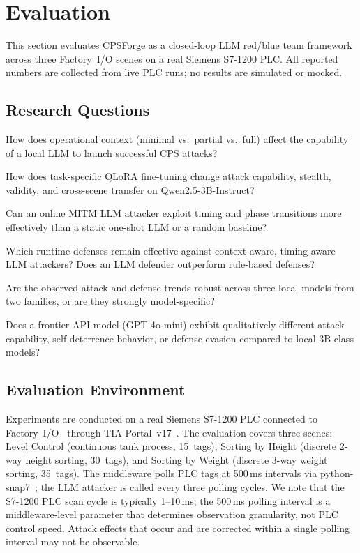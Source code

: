 \section{Evaluation}
\label{sec:evaluation}

This section evaluates CPSForge as a closed-loop LLM red/blue team framework across three Factory~I/O scenes on a real Siemens S7-1200 PLC. All reported numbers are collected from live PLC runs; no results are simulated or mocked.

\subsection{Research Questions}

\begin{description}[leftmargin=1.5em, style=nextline]
    \item[RQ1 (Context Ablation):] How does operational context (minimal vs.\ partial vs.\ full) affect the capability of a local LLM to launch successful CPS attacks?
    \item[RQ2 (Fine-Tuning):] How does task-specific QLoRA fine-tuning change attack capability, stealth, validity, and cross-scene transfer on Qwen2.5-3B-Instruct?
    \item[RQ3 (Attack Mode):] Can an online MITM LLM attacker exploit timing and phase transitions more effectively than a static one-shot LLM or a random baseline?
    \item[RQ4 (Defenses):] Which runtime defenses remain effective against context-aware, timing-aware LLM attackers? Does an LLM defender outperform rule-based defenses?
    \item[RQ5 (Cross-Model Robustness):] Are the observed attack and defense trends robust across three local models from two families, or are they strongly model-specific?
    \item[RQ6 (Frontier Model):] Does a frontier API model (GPT-4o-mini) exhibit qualitatively different attack capability, self-deterrence behavior, or defense evasion compared to local 3B-class models?
\end{description}

\subsection{Evaluation Environment}

Experiments are conducted on a real Siemens S7-1200 PLC connected to Factory~I/O~\cite{factoryio} through TIA Portal~v17~\cite{tiaportal}. The evaluation covers three scenes: Level Control (continuous tank process, 15~tags), Sorting by Height (discrete 2-way height sorting, 30~tags), and Sorting by Weight (discrete 3-way weight sorting, 35~tags). The middleware polls PLC tags at 500\,ms intervals via python-snap7~\cite{snap7}; the LLM attacker is called every three polling cycles. We note that the S7-1200 PLC scan cycle is typically 1--10\,ms; the 500\,ms polling interval is a middleware-level parameter that determines observation granularity, not PLC control speed. Attack effects that occur and are corrected within a single polling interval may not be observable.


